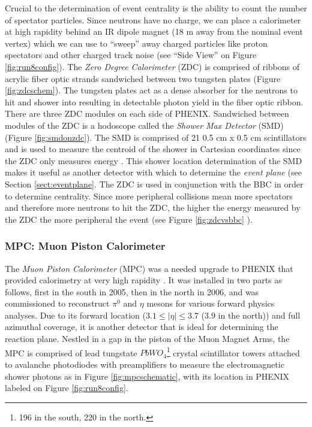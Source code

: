 Crucial to the determination of event centrality is the ability to count the number of spectator particles. Since neutrons have no charge, we can place a calorimeter at high rapidity behind an IR dipole magnet (18 m away from the nominal event vertex) which we can use to ``sweep'' away charged particles like proton spectators and other charged track noise (see ``Side View'' on Figure \ref{fig:run8config}). The \textit{Zero Degree Calorimeter} (ZDC) \citep{ZDCfocus} is comprised of ribbons of acrylic fiber optic strands sandwiched between two tungsten plates (Figure \ref{fig:zdcschem}). The tungsten plates act as a dense absorber for the neutrons to hit and shower into resulting in detectable photon yield in the fiber optic ribbon. There are three ZDC modules on each side of PHENIX. Sandwiched between modules of the ZDC is a hodoscope called the \textit{Shower Max Detector} (SMD) (Figure \ref{fig:smdonzdc}). The SMD is comprised of 21 0.5 cm x 0.5 cm scintillators and is used to measure the centroid of the shower in Cartesian coordinates since the ZDC only measures energy \citep{phenixzdc}. This shower location determination of the SMD makes it useful as another detector with which to determine the \textit{event plane} (see Section \ref{sect:eventplane}. The ZDC is used in conjunction with the BBC in order to determine centrality. Since more peripheral collisions mean more spectators and therefore more neutrons to hit the ZDC, the higher the energy measured by the ZDC the more peripheral the event (see Figure \ref{fig:zdcvsbbc} \citep{Ghosh2001}). 

\subsubsection{MPC: Muon Piston Calorimeter}
The \textit{Muon Piston Calorimeter} (MPC) was a needed upgrade to PHENIX that provided calorimetry at very high rapidity \citep{kleinjanthesis}. It was installed in two parts as follows, first in the south in 2005, then in the north in 2006, and was commissioned to reconstruct $\pi^{0}$ and $\eta$ mesons for various forward physics analyses. Due to its forward location ($3.1 \leq  | \eta | \leq 3.7$ ($3.9$ in the north)) and full azimuthal coverage, it is another detector that is ideal for determining the reaction plane. Nestled in a gap in the piston of the Muon Magnet Arms, the MPC is comprised of lead tungstate $PbWO_4$\footnote{196 in the south, 220 in the north.} crystal scintillator towers attached to avalanche photodiodes with preamplifiers to measure the electromagnetic shower photons as in Figure \ref{fig:mpcschematic}, with its location in PHENIX labeled on Figure \ref{fig:run8config}.  

